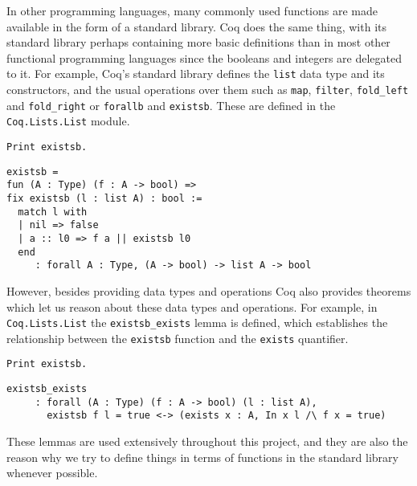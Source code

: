 In other programming languages, many commonly used functions are made available in the form of a
standard library. Coq does the same thing, with its standard library perhaps containing more basic
definitions than in most other functional programming languages since the booleans and integers are
delegated to it. For example, Coq's standard library defines the \texttt{list} data type and
its constructors, and the usual operations over them such as \texttt{map}, 
\texttt{filter}, \texttt{fold_left} and \texttt{fold_right} or
\texttt{forallb} and \texttt{existsb}. These are defined in the
\texttt{Coq.Lists.List} module.

\begin{verbatim}
Print existsb.
\end{verbatim}
\vspace{-\baselineskip*3/2}
\begin{verbatim}
existsb = 
fun (A : Type) (f : A -> bool) =>
fix existsb (l : list A) : bool :=
  match l with
  | nil => false
  | a :: l0 => f a || existsb l0
  end
     : forall A : Type, (A -> bool) -> list A -> bool
\end{verbatim}


However, besides providing data types and operations Coq also provides theorems which let us reason
about these data types and operations. For example, in \texttt{Coq.Lists.List} the
\texttt{existsb_exists} lemma is defined, which establishes the relationship between the
\texttt{existsb} function and the \texttt{exists} quantifier.

\begin{verbatim}
Print existsb.
\end{verbatim}
\vspace{-\baselineskip*3/2}
\begin{verbatim}
existsb_exists
     : forall (A : Type) (f : A -> bool) (l : list A),
       existsb f l = true <-> (exists x : A, In x l /\ f x = true)
\end{verbatim}

These lemmas are used extensively throughout this project, and they are also the reason why we try to
define things in terms of functions in the standard library whenever possible.